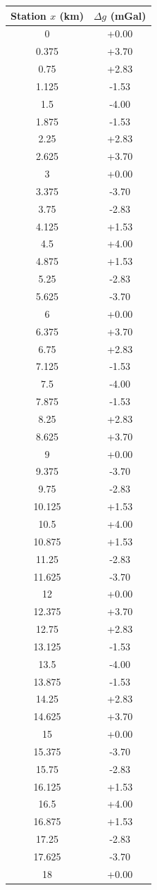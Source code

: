 \begin{tabular}{cc}
\toprule
Station $x$ (km) & $\Delta g$ (mGal) \\
\midrule
0 & +0.00 \\
0.375 & +3.70 \\
0.75 & +2.83 \\
1.125 & -1.53 \\
1.5 & -4.00 \\
1.875 & -1.53 \\
2.25 & +2.83 \\
2.625 & +3.70 \\
3 & +0.00 \\
3.375 & -3.70 \\
3.75 & -2.83 \\
4.125 & +1.53 \\
4.5 & +4.00 \\
4.875 & +1.53 \\
5.25 & -2.83 \\
5.625 & -3.70 \\
6 & +0.00 \\
6.375 & +3.70 \\
6.75 & +2.83 \\
7.125 & -1.53 \\
7.5 & -4.00 \\
7.875 & -1.53 \\
8.25 & +2.83 \\
8.625 & +3.70 \\
9 & +0.00 \\
9.375 & -3.70 \\
9.75 & -2.83 \\
10.125 & +1.53 \\
10.5 & +4.00 \\
10.875 & +1.53 \\
11.25 & -2.83 \\
11.625 & -3.70 \\
12 & +0.00 \\
12.375 & +3.70 \\
12.75 & +2.83 \\
13.125 & -1.53 \\
13.5 & -4.00 \\
13.875 & -1.53 \\
14.25 & +2.83 \\
14.625 & +3.70 \\
15 & +0.00 \\
15.375 & -3.70 \\
15.75 & -2.83 \\
16.125 & +1.53 \\
16.5 & +4.00 \\
16.875 & +1.53 \\
17.25 & -2.83 \\
17.625 & -3.70 \\
18 & +0.00 \\
\bottomrule
\end{tabular}
